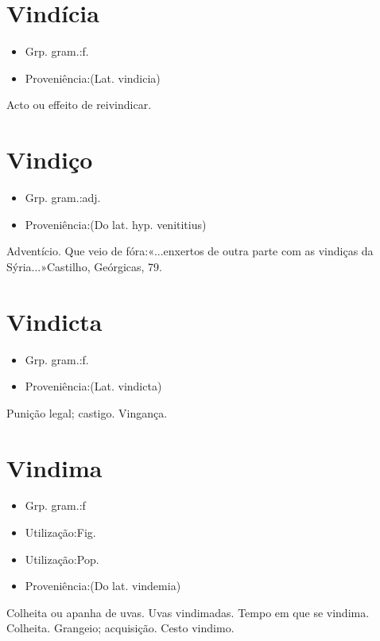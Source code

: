 \documentclass{article}
\begin{document}
\section{Vindícia}
\begin{itemize}
\item {Grp. gram.:f.}
\end{itemize}
\begin{itemize}
\item {Proveniência:(Lat. \textunderscore vindicia\textunderscore )}
\end{itemize}
Acto ou effeito de reivindicar.
\section{Vindiço}
\begin{itemize}
\item {Grp. gram.:adj.}
\end{itemize}
\begin{itemize}
\item {Proveniência:(Do lat. hyp. \textunderscore venititius\textunderscore )}
\end{itemize}
Adventício.
Que veio de fóra:«\textunderscore ...enxertos de outra parte com as vindiças da Sýria...\textunderscore »Castilho, \textunderscore Geórgicas\textunderscore , 79.
\section{Vindicta}
\begin{itemize}
\item {Grp. gram.:f.}
\end{itemize}
\begin{itemize}
\item {Proveniência:(Lat. \textunderscore vindicta\textunderscore )}
\end{itemize}
Punição legal; castigo.
Vingança.
\section{Vindima}
\begin{itemize}
\item {Grp. gram.:f}
\end{itemize}
\begin{itemize}
\item {Utilização:Fig.}
\end{itemize}
\begin{itemize}
\item {Utilização:Pop.}
\end{itemize}
\begin{itemize}
\item {Proveniência:(Do lat. \textunderscore vindemia\textunderscore )}
\end{itemize}
Colheita ou apanha de uvas.
Uvas vindimadas.
Tempo em que se vindima.
Colheita.
Grangeio; acquisição.
Cesto vindimo.
\end{document}
